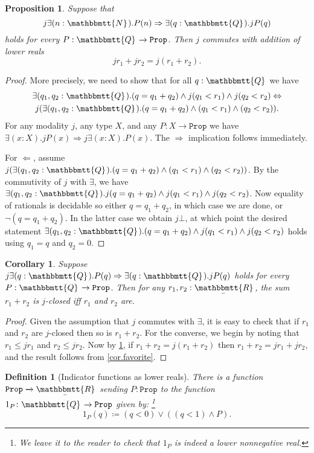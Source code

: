 \documentclass[reqno,11pt]{amsproc}
\theoremstyle{plain}
\newtheorem{proposition}[theorem]{Proposition}
\newtheorem{corollary}[theorem]{Corollary}
\newtheorem{definition}[theorem]{Definition}
\theoremstyle{definition}
\newcommand{\Const}[1]{\mathtt{#1}}
\renewcommand{\to}[1][]{\xrightarrow{#1}}
\newcommand{\ubar}[1]{\underaccent{\bar}{#1}}
\newcommand{\ind}[1]{1_{#1}}			%
\newcommand{\internal}[1]{\raisebox{-.03ex}{$\mathbbmtt{#1}$}}
\newcommand{\hs}{\hspace{1pt}}
\newcommand{\tnn}{\internal{N}\hs}
\newcommand{\tqq}{\internal{Q}\hs}
\newcommand{\trr}{\internal{R}}
\newcommand{\tlrr}{\ubar{\trr}\hs}
\newcommand{\prop}{\Const{Prop}}
\newcommand{\imp}{\Rightarrow}
\renewcommand{\iff}{\Leftrightarrow}
\numberwithin{equation}{section}
\begin{document}
\begin{proposition}\label{prop.commute_exists_commute_addition}
Suppose that
\[
	j\exists(n:\tnn) . P(n)\imp \exists(q:\tqq).jP(q)
\]
holds for every $P:\tqq\to\prop$. Then $j$ commutes with addition of lower reals
\[
	jr_1+jr_2=j(r_1+r_2).
\]
\end{proposition}
\begin{proof}
More precisely, we need to show that for all $q:\tqq$ we have
\begin{multline*}
	\exists(q_1,q_2:\tqq).(q=q_1+q_2)\wedge j(q_1<r_1)\wedge j(q_2<r_2)\iff\\
	j(\exists(q_1,q_2:\tqq).(q=q_1+q_2)\wedge (q_1<r_1)\wedge(q_2<r_2)).
\end{multline*}
For any modality $j$, any type $X$, and any $P:X\to\prop$ we have $\exists(x:X).jP(x)\imp j\exists(x:X).P(x)$. The $\imp$ implication follows immediately.

For $\Leftarrow$, assume $j(\exists(q_1,q_2:\tqq).(q=q_1+q_2)\wedge (q_1<r_1)\wedge(q_2<r_2))$. By the commutivity of $j$ with $\exists$, we have $\exists(q_1,q_2:\tqq).j(q=q_1+q_2)\wedge j(q_1<r_1)\wedge j(q_2<r_2)$. Now equality of rationals is decidable so either $q=q_1+q_2$, in which case we are done, or $\neg(q=q_1+q_2)$. In the latter case we obtain $j\bot$, at which point the desired statement $\exists(q_1,q_2:\tqq).(q=q_1+q_2)\wedge j(q_1<r_1)\wedge j(q_2<r_2)$ holds using $q_1=q$ and $q_2=0$.
\end{proof}

\begin{corollary}\label{cor.closed_sum}
Suppose $j\exists(q:\tqq).P(q)\imp \exists(q:\tqq).jP(q)$ holds for every $P:\tqq\to\prop$. Then for any $r_1,r_2:\tlrr$, the sum $r_1+r_2$ is $j$-closed iff $r_1$ and $r_2$ are.
\end{corollary}
\begin{proof}
Given the assumption that $j$ commutes with $\exists$, it is easy to check that if $r_1$ and $r_2$ are $j$-closed then so is $r_1+r_2$. For the converse, we begin by noting that $r_1\le jr_1$ and $r_2\le jr_2$. Now by \cref{prop.commute_exists_commute_addition}, if $r_1+r_2=j(r_1+r_2)$ then $r_1+r_2=jr_1+jr_2$, and the result follows from \cref{cor.favorite}.
\end{proof}

\begin{definition}[Indicator functions as lower reals]\label{def.props_are_reals}
There is a function $\prop\to\tlrr$ sending $P:\prop$ to the function $\ind{P}\colon\tqq\to\prop$ given by:%
\footnote{We leave it to the reader to check that $\ind{P}$ is indeed a lower nonnegative real.}
\[\ind{P}(q)\coloneqq(q<0)\lor ((q<1)\wedge P).\]
\end{definition}
\end{document}
